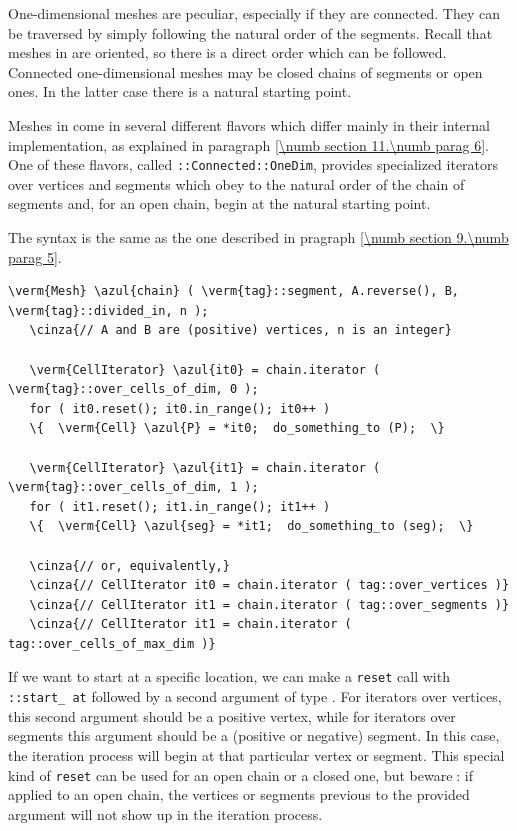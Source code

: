 One-dimensional meshes are peculiar, especially if they are connected.
They can be traversed by simply following the natural order of the segments.
Recall that meshes in {\maniFEM} are oriented, so there is a direct order which can be followed.
Connected one-dimensional meshes may be closed chains of segments or open ones.
In the latter case there is a natural starting point.

Meshes in {\maniFEM} come in several different flavors which differ mainly in their internal
implementation, as explained in paragraph \ref{\numb section 11.\numb parag 6}.
One of these flavors, called {\small\tt {}::Connected::OneDim}, provides specialized iterators
over vertices and segments which obey to the natural order of the chain of segments and,
for an open chain, begin at the natural starting point.

The syntax is the same as the one described in pragraph \ref{\numb section 9.\numb parag 5}.

\begin{Verbatim}[commandchars=\\\{\},formatcom=\small\tt,
   baselinestretch=0.94,framesep=2mm                      ]
   \verm{Mesh} \azul{chain} ( \verm{tag}::segment, A.reverse(), B, \verm{tag}::divided_in, n );
   \cinza{// A and B are (positive) vertices, n is an integer}
   
   \verm{CellIterator} \azul{it0} = chain.iterator ( \verm{tag}::over_cells_of_dim, 0 );
   for ( it0.reset(); it0.in_range(); it0++ )
   \{  \verm{Cell} \azul{P} = *it0;  do_something_to (P);  \}

   \verm{CellIterator} \azul{it1} = chain.iterator ( \verm{tag}::over_cells_of_dim, 1 );
   for ( it1.reset(); it1.in_range(); it1++ )
   \{  \verm{Cell} \azul{seg} = *it1;  do_something_to (seg);  \}
   
   \cinza{// or, equivalently,}
   \cinza{// CellIterator it0 = chain.iterator ( tag::over_vertices )}
   \cinza{// CellIterator it1 = chain.iterator ( tag::over_segments )}
   \cinza{// CellIterator it1 = chain.iterator ( tag::over_cells_of_max_dim )}
\end{Verbatim}

If we want to start at a specific location, we can make a {\small\tt reset} call with
{\small\tt {}::start\_\,at} followed by a second argument of type {\small\tt{}}.
For iterators over vertices, this second argument should be a positive vertex,
while for iterators over segments this argument should be a (positive or negative) segment.
In this case, the iteration process will begin at that particular vertex or segment.
This special kind of {\small\tt reset} can be used for an open chain or a closed one,
but beware$\;$: if applied to an open chain, the vertices or segments previous to the provided
argument will not show up in the iteration process.

